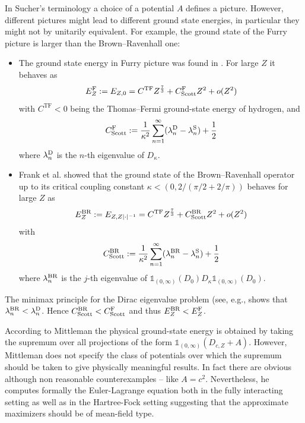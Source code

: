 \documentclass[a4paper]{amsart}
\def\1{{\mathds{1}}}
\begin{document}
In Sucher's terminology a choice of a potential $A$ defines a
picture. However, different pictures might lead to different ground
state energies, in particular they might not by unitarily
equivalent. For example, the ground state of the Furry picture is
larger than the Brown--Ravenhall one:
\begin{itemize}
\item The ground state energy in Furry picture was found in
  \cite{HandrekSiedentop2015}. For large $Z$  it behaves as
  \begin{equation}
    \label{eq:Scott-Furry}
   E^{\rm F}_{Z}:=E_{Z,0}= C^\mathrm{TF}Z^{\frac73}+C_\mathrm{Scott}^{\rm F}Z^2+o(Z^2)
 \end{equation}
 with $C^\mathrm{TF}<0$ being the Thomas--Fermi ground-state energy of
hydrogen, and
\begin{equation}
  C_\mathrm{Scott}^{\rm F}:= \frac{1}{\kappa^2}
  \sum_{n=1}^\infty(\lambda_n^{\rm D}-\lambda_n^{\rm S})+\frac12
\end{equation}
where $\lambda_n^{\rm D}$ is the $n$-th eigenvalue of $D_\kappa$.
\item Frank et al. \cite{Franketal2009} showed that the ground state
  of the Brown--Ravenhall operator up to its critical coupling
  constant $\kappa<(0,2/(\pi/2+2/\pi))$ behaves for large $Z$ as
\begin{equation}
   E^{\rm BR}_{Z}:=E_{Z,Z|\cdot|^{-1}} = C^\mathrm{TF}Z^{\frac73}+C_\mathrm{Scott}^{\rm BR}Z^2+o(Z^2)
\end{equation}
with
\begin{equation}
    C_\mathrm{Scott}^{\rm BR}:= \frac{1}{\kappa^2}\sum_{n=1}^\infty(\lambda_n^{\rm BR}-\lambda_n^{\rm S})+\frac{1}{2}
\end{equation}
where $\lambda_n^{\rm BR}$ is the $j$-th eigenvalue of
$\1_{(0,\infty)}(D_0)D_\kappa\1_{(0,\infty)}(D_0)$.
\end{itemize}
The minimax principle for the Dirac eigenvalue problem (see, e.g.,
\cite{GriesemerSiedentop1999,Dolbeaultetal2000O} shows that
$\lambda_n^{\rm BR} < \lambda_n^{\rm D}$. Hence
$C_\mathrm{Scott}^{\rm BR}< C_\mathrm{Scott}^{\rm F}$ and thus
$E_{Z}^{\rm BR}<E_{Z}^{\rm F}$.

According to Mittleman \cite{Mittleman1981} the physical ground-state
energy is obtained by taking the supremum over all projections of the
form $\1_{(0,\infty)}(D_{c,Z}+A)$.  However, Mittleman does not
specify the class of potentials over which the supremum should be
taken to give physically meaningful results. In fact there are obvious
although non reasonable counterexamples -- like $A=c^2$. Nevertheless,
he computes formally the Euler-Lagrange equation both in the fully
interacting setting as well as in the Hartree-Fock setting suggesting
that the approximate maximizers should be of mean-field type.
\end{document}
